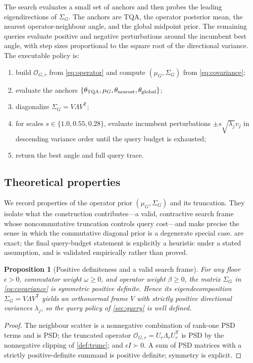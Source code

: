 \documentclass[aps,prresearch,reprint,amsmath,amssymb,floatfix,nofootinbib,superscriptaddress,longbibliography]{revtex4-2}
\newtheorem{proposition}{Proposition}
\theoremstyle{remark}
\newcommand{\TQA}{\textnormal{\textsc{TQA}}}
\newcommand{\calO}{\mathcal{O}}
\begin{document}
The search evaluates a small set of anchors and then probes the leading
eigendirections of \(\Sigma_G\).  The anchors are \TQA{}, the operator posterior
mean, the nearest operator-neighbour angle, and the global midpoint prior.  The
remaining queries evaluate positive and negative perturbations around the
incumbent best angle, with step sizes proportional to the square root of the
directional variance.  The executable policy is:
\begin{enumerate}
    \item build \(\calO_{G,r}\) from \cref{eq:operator} and compute
    \((\mu_G,\Sigma_G)\) from \cref{eq:covariance};
    \item evaluate the anchors
    \(\{\theta_{\TQA},\mu_G,\theta_{\mathrm{nearest}},\theta_{\mathrm{global}}\}\);
    \item diagonalize \(\Sigma_G=V\Lambda V^{\mathsf T}\);
    \item for scales \(s\in\{1.0,0.55,0.28\}\), evaluate incumbent perturbations
    \(\pm s\sqrt{\lambda_j}v_j\) in descending variance order until the query
    budget is exhausted;
    \item return the best angle and full query trace.
\end{enumerate}

\subsection{Theoretical properties}
\label{sec:theory}

We record properties of the operator prior \((\mu_G,\Sigma_G)\) and its
truncation.  They isolate what the construction contributes---a valid,
contractive search frame whose noncommutative truncation controls query
cost---and make precise the sense in which the commutative diagonal prior is a
degenerate special case.   are exact; the final
query-budget statement is explicitly a heuristic under a stated assumption, and
is validated empirically rather than proved.

\begin{proposition}[Positive definiteness and a valid search frame]
\label{prop:pd}
For any floor \(\epsilon>0\), commutator weight \(\omega\ge0\), and operator
weight \(\beta\ge0\), the matrix \(\Sigma_G\) in \cref{eq:covariance} is
symmetric positive definite.  Hence its eigendecomposition
\(\Sigma_G=V\Lambda V^{\mathsf T}\) yields an orthonormal frame \(V\) with
strictly positive directional variances \(\lambda_j\), so the query policy of
\cref{sec:query} is well defined.
\end{proposition}
\begin{proof}
The neighbour scatter is a nonnegative combination of rank-one PSD terms and is
PSD; the truncated operator \(\calO_{G,r}=U_r\Lambda_rU_r^{\mathsf T}\) is PSD by
the nonnegative clipping of \cref{def:trunc}; and \(\epsilon I\succ0\).  A sum of
PSD matrices with a strictly positive-definite summand is positive definite;
symmetry is explicit.
\end{proof}
\end{document}
